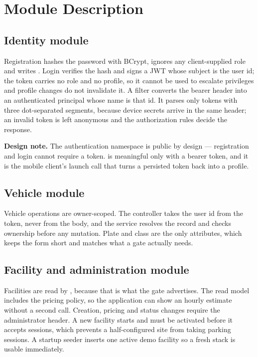 \section{Module Description}

\subsection{Identity module}

Registration hashes the password with BCrypt, ignores any client-supplied role and
writes . Login verifies the hash and signs a JWT whose subject is the
user id; the token carries no role and no profile, so it cannot be used to escalate
privileges and profile changes do not invalidate it. A filter converts the bearer
header into an authenticated principal whose name is that id. It parses only tokens
with three dot-separated segments, because device secrets arrive in the same header;
an invalid token is left anonymous and the authorization rules decide the response.

\textbf{Design note.} The authentication namespace is public by design ---
registration and login cannot require a token.  is meaningful only
with a bearer token, and it is the mobile client's launch call that turns a persisted
token back into a profile.

\subsection{Vehicle module}

Vehicle operations are owner-scoped. The controller takes the user id from the token,
never from the body, and the service resolves the record and checks ownership before
any mutation. Plate and class are the only attributes, which keeps the form short and
matches what a gate actually needs.

\subsection{Facility and administration module}

Facilities are read by , because that is what the gate advertises.
The read model includes the pricing policy, so the application can show an hourly
estimate without a second call. Creation, pricing and status changes require the
administrator header. A new facility starts  and must be activated
before it accepts sessions, which prevents a half-configured site from taking
parking sessions. A startup seeder inserts one active demo facility so a fresh stack
is usable immediately.

